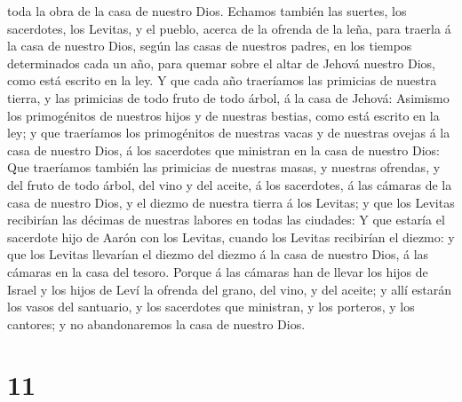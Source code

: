 toda la obra de la casa de nuestro Dios.  Echamos también
las suertes, los sacerdotes, los Levitas, y el pueblo, acerca de la
ofrenda de la leña, para traerla á la casa de nuestro Dios, según las
casas de nuestros padres, en los tiempos determinados cada un año, para
quemar sobre el altar de Jehová nuestro Dios, como está escrito en la
ley.  Y que cada año traeríamos las primicias de nuestra
tierra, y las primicias de todo fruto de todo árbol, á la casa de
Jehová:  Asimismo los primogénitos de nuestros hijos y de
nuestras bestias, como está escrito en la ley; y que traeríamos los
primogénitos de nuestras vacas y de nuestras ovejas á la casa de nuestro
Dios, á los sacerdotes que ministran en la casa de nuestro Dios:
 Que traeríamos también las primicias de nuestras masas,
y nuestras ofrendas, y del fruto de todo árbol, del vino y del aceite, á
los sacerdotes, á las cámaras de la casa de nuestro Dios, y el diezmo de
nuestra tierra á los Levitas; y que los Levitas recibirían las décimas
de nuestras labores en todas las ciudades:  Y que estaría
el sacerdote hijo de Aarón con los Levitas, cuando los Levitas
recibirían el diezmo: y que los Levitas llevarían el diezmo del diezmo á
la casa de nuestro Dios, á las cámaras en la casa del tesoro.
 Porque á las cámaras han de llevar los hijos de Israel y
los hijos de Leví la ofrenda del grano, del vino, y del aceite; y allí
estarán los vasos del santuario, y los sacerdotes que ministran, y los
porteros, y los cantores; y no abandonaremos la casa de nuestro Dios.

\hypertarget{section-10}{%
\section{11}\label{section-10}}

